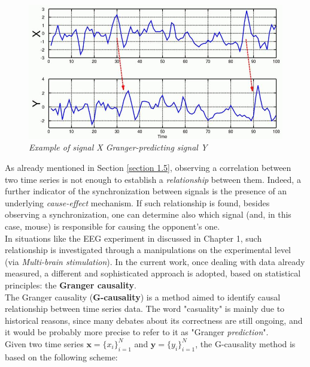 \documentclass[12pt, a4paper]{report}
\begin{document}
\begin{figure}[H]
	\begin{center}
		\hspace*{-1cm}
		\includegraphics[scale=.6]{GC.png} 
	\end{center} 
	\caption{\textit{Example of signal X Granger-predicting signal Y }} 
	
\end{figure}

As already mentioned in Section \ref{section 1.5}, observing a correlation between two time series 
is not enough to establish a \textit{relationship} between them. Indeed, a further indicator of  the synchronization between signals is the presence of an underlying \textit{cause-effect} mechanism. If such relationship is found, besides observing a synchronization, one can determine also which signal (and, in this case, mouse) is responsible for causing the opponent's one.\\
In situations like the EEG experiment in \cite{15} %
 discussed in Chapter 1, such relationship is investigated through a manipulations on the experimental level (via \textit{Multi-brain stimulation}). In  the current work, once dealing with data already measured, a different and sophisticated approach is adopted, based on statistical principles: the \textbf{Granger causality}.\\
The Granger causality (\textbf{G-causality}) is a method aimed to identify causal relationship between time series data. The word "casuality" is mainly due to historical reasons, since many debates about its correctness are still ongoing, and it would be probably more precise to refer to it as "Granger \textit{prediction}".
\\

Given two time series $ \textbf{x} = \{x_i\}_{i=1}^N$ and  $\textbf{y} = \{y_i\}_{i=1}^N$, the G-causality method is based on the following scheme:
\end{document}
